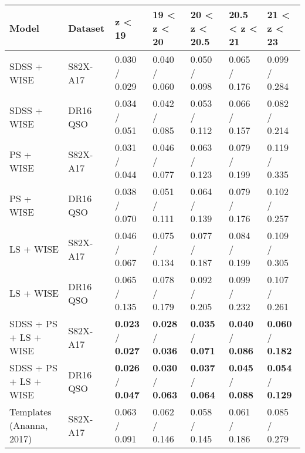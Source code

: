 \begin{table*}
    \centering
    \begin{tabular}{lllllll}
    \hline
                        Model &   Dataset &                           z < 19 &                      19 < z < 20 &                    20 < z < 20.5 &                    20.5 < z < 21 &                      21 < z < 23 \\
    \hline
                  SDSS + WISE &  S82X-A17 &                    0.030 / 0.029 &                    0.040 / 0.060 &                    0.050 / 0.098 &                    0.065 / 0.176 &                    0.099 / 0.284 \\
                  SDSS + WISE &  DR16 QSO &                    0.034 / 0.051 &                    0.042 / 0.085 &                    0.053 / 0.112 &                    0.066 / 0.157 &                    0.082 / 0.214 \\
                    PS + WISE &  S82X-A17 &                    0.031 / 0.044 &                    0.046 / 0.077 &                    0.063 / 0.123 &                    0.079 / 0.199 &                    0.119 / 0.335 \\
                    PS + WISE &  DR16 QSO &                    0.038 / 0.070 &                    0.051 / 0.111 &                    0.064 / 0.139 &                    0.079 / 0.176 &                    0.102 / 0.257 \\
                    LS + WISE &  S82X-A17 &                    0.046 / 0.067 &                    0.075 / 0.134 &                    0.077 / 0.187 &                    0.084 / 0.199 &                    0.109 / 0.305 \\
                    LS + WISE &  DR16 QSO &                    0.065 / 0.135 &                    0.078 / 0.179 &                    0.092 / 0.205 &                    0.099 / 0.232 &                    0.107 / 0.261 \\
        SDSS + PS + LS + WISE &  S82X-A17 &  \textbf{0.023} / \textbf{0.027} &  \textbf{0.028} / \textbf{0.036} &  \textbf{0.035} / \textbf{0.071} &  \textbf{0.040} / \textbf{0.086} &  \textbf{0.060} / \textbf{0.182} \\
        SDSS + PS + LS + WISE &  DR16 QSO &  \textbf{0.026} / \textbf{0.047} &  \textbf{0.030} / \textbf{0.063} &  \textbf{0.037} / \textbf{0.064} &  \textbf{0.045} / \textbf{0.088} &  \textbf{0.054} / \textbf{0.129} \\
     Templates (Ananna, 2017) &  S82X-A17 &                    0.063 / 0.091 &                    0.062 / 0.146 &                    0.058 / 0.145 &                    0.061 / 0.186 &                    0.085 / 0.279 \\

\end{tabular}
\end{table*}
